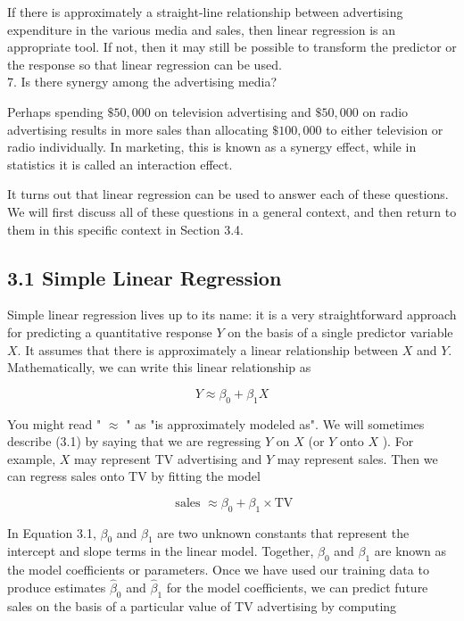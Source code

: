 \documentclass[10pt]{article}
\begin{document}
If there is approximately a straight-line relationship between advertising expenditure in the various media and sales, then linear regression is an appropriate tool. If not, then it may still be possible to transform the predictor or the response so that linear regression can be used.\\
7. Is there synergy among the advertising media?

Perhaps spending $\$ 50,000$ on television advertising and $\$ 50,000$ on radio advertising results in more sales than allocating $\$ 100,000$ to either television or radio individually. In marketing, this is known as a synergy effect, while in statistics it is called an interaction effect.

It turns out that linear regression can be used to answer each of these questions. We will first discuss all of these questions in a general context, and then return to them in this specific context in Section 3.4.


\subsection*{3.1 Simple Linear Regression}
Simple linear regression lives up to its name: it is a very straightforward approach for predicting a quantitative response $Y$ on the basis of a single predictor variable $X$. It assumes that there is approximately a linear relationship between $X$ and $Y$. Mathematically, we can write this linear relationship as


\begin{equation*}
Y \approx \beta_{0}+\beta_{1} X \tag{3.1}
\end{equation*}


You might read " $\approx$ " as "is approximately modeled as". We will sometimes describe (3.1) by saying that we are regressing $Y$ on $X$ (or $Y$ onto $X$ ). For example, $X$ may represent TV advertising and $Y$ may represent sales. Then we can regress sales onto TV by fitting the model

$$
\text { sales } \approx \beta_{0}+\beta_{1} \times \mathrm{TV}
$$

In Equation 3.1, $\beta_{0}$ and $\beta_{1}$ are two unknown constants that represent the intercept and slope terms in the linear model. Together, $\beta_{0}$ and $\beta_{1}$ are known as the model coefficients or parameters. Once we have used our training data to produce estimates $\hat{\beta}_{0}$ and $\hat{\beta}_{1}$ for the model coefficients, we can predict future sales on the basis of a particular value of TV advertising by computing
\end{document}
